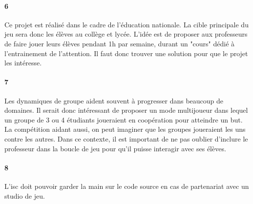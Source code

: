\paragraph{6}Ce projet est réalisé dans le cadre de l'éducation nationale. La cible principale du jeu sera donc les élèves au collège et lycée. L'idée est de proposer aux professeurs de
faire jouer leurs élèves pendant 1h par semaine, durant un "cours" dédié à l'entrainement de l'attention. Il faut donc trouver une solution pour que le projet les intéresse.
\paragraph{7}Les dynamiques de groupe aident souvent à progresser dans beaucoup de domaines. Il serait donc intéressant de proposer un mode multijoueur dans lequel un groupe de 3 ou 4
étudiants joueraient en coopération pour atteindre un but. La compétition aidant aussi, on peut imaginer que les groupes joueraient les uns contre les autres. Dans ce contexte, il est
important de ne pas oublier d'inclure le professeur dans la boucle de jeu pour qu'il puisse interagir avec ses élèves.
\paragraph{8}L'\gls{isc} doit pouvoir garder la main sur le code source en cas de partenariat avec un studio de jeu.